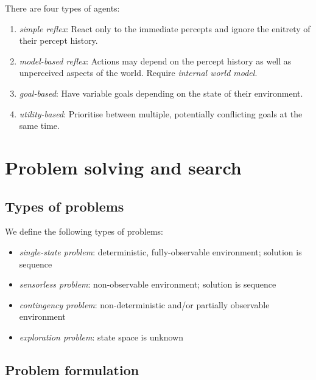 \documentclass{article}
\begin{document}
\begin{definition}[R\&N p. 47]
    There are four types of agents:
    \begin{enumerate}
        \item \emph{simple reflex}: React only to the immediate percepts and ignore
              the enitrety of their percept history.
        \item \emph{model-based reflex}: Actions may depend on the percept history
              as well as unperceived aspects of the world. Require \emph{internal world
                  model}.
        \item \emph{goal-based}: Have variable goals depending on the state of their
              environment.
        \item \emph{utility-based}: Prioritise between multiple, potentially conflicting
              goals at the same time.
    \end{enumerate}
\end{definition}

\section{Problem solving and search}


\subsection{Types of problems}

\begin{definition}
    We define the following types of problems:
    \begin{itemize}
        \item \emph{single-state problem}: deterministic, fully-observable environment; solution is sequence
        \item \emph{sensorless problem}: non-observable environment; solution is sequence
        \item \emph{contingency problem}: non-deterministic and/or partially observable environment
        \item \emph{exploration problem}: state space is unknown
    \end{itemize}
\end{definition}

\subsection{Problem formulation}
\end{document}
